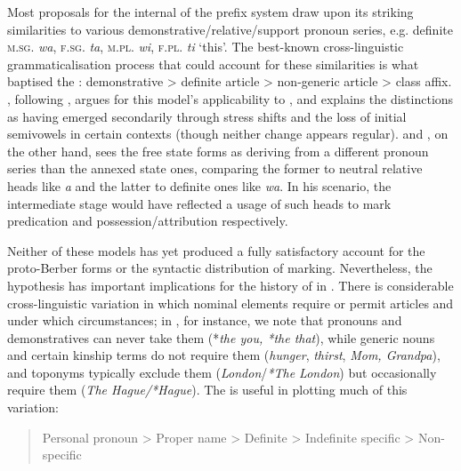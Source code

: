 \documentclass[output=paper,colorlinks,citecolor=brown]{langscibook}
\begin{document}
Most proposals for the internal  of the prefix system draw upon its striking similarities to various demonstrative/relative/support pronoun series, e.g.  definite \textsc{m.sg.} \emph{wa}, \textsc{f.sg.} \emph{ta}, \textsc{m.pl.} \emph{wi}, \textsc{f.pl.} \emph{ti} `this'. The best-known cross-linguistic grammaticalisation process that could account for these similarities is what \citet{greenberg1978} baptised the : demonstrative \textgreater{} definite article \textgreater{} non-generic article \textgreater{} class affix. \citet{brugnatelli1997, brugnatelli2006}, following \citet{vycichl1957}, argues for this model's applicability to , and explains the  distinctions as having emerged secondarily through stress shifts and the loss of initial semivowels in certain contexts (though neither change appears regular). \citet[12]{prasse1974} and \citet{prasse2002}, on the other hand, sees the free state forms as deriving from a different pronoun series than the annexed state ones, comparing the former to  neutral relative heads like \emph{a} and the latter to definite ones like \emph{wa}. In his scenario, the intermediate stage would have reflected a usage of such heads to mark predication and possession/attribution respectively.

Neither of these models has yet produced a fully satisfactory account for the proto-Berber forms or the syntactic distribution of  marking. Nevertheless, the  hypothesis has important implications for the history of  in . There is considerable cross-linguistic variation in which nominal elements require or permit articles and under which circumstances; in , for instance, we note that pronouns and demonstratives can never take them (*\emph{the you, *the that}), while generic nouns and certain kinship terms do not require them (\emph{hunger}, \emph{thirst}, \emph{Mom, Grandpa}), and toponyms typically exclude them (\emph{London}/\emph{*The London}) but occasionally require them (\emph{The Hague/*Hague}). The  \citep{aissen2003} is useful in plotting much of this variation:

\begin{quote}
	Personal pronoun \textgreater{} Proper name \textgreater{} Definite \textgreater{} Indefinite specific \textgreater{} \newline Non-specific
\end{quote}
\end{document}
